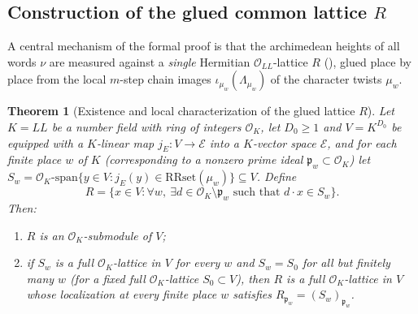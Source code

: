 \documentclass[11pt]{amsart}
\newcommand{\Oc}{\mathcal{O}}
\newcommand{\fp}{\mathfrak{p}}
\theoremstyle{plain}
\newtheorem{theorem}{Theorem}[section]
\theoremstyle{definition}
\numberwithin{equation}{section}
\begin{document}
\subsection{Construction of the glued common lattice $R$}

A central mechanism of the formal proof is that the archimedean heights of all words $\nu$ are
measured against a \emph{single} Hermitian $\Oc_{LL}$-lattice $R$ (), glued place by place
from the local $m$-step chain images $\iota_{\mu_w}(\Lambda_{\mu_w})$ of the character twists
$\mu_w$.

\begin{theorem}[Existence and local characterization of the glued lattice $R$]\label{thm:gluedR}
Let $K=LL$ be a number field with ring of integers $\Oc_K$, let $D_0\ge1$ and $V=K^{D_0}$ be
equipped with a $K$-linear map $j_E:V\to \mathcal E$ into a $K$-vector space $\mathcal E$, and for
each finite place $w$ of $K$ (corresponding to a nonzero prime ideal $\fp_w\subset\Oc_K$) let
$S_w=\Oc_K\text{-}\mathrm{span}\{y\in V : j_E(y)\in \mathrm{RRset}(\mu_w)\}\subseteq V$. Define
\begin{equation}\label{eq:prescribedR}
R=\bigl\{x\in V : \forall w,\ \exists d\in\Oc_K\setminus\fp_w\text{ such that } d\cdot x\in S_w\bigr\}.
\end{equation}
Then:
\begin{enumerate}[label=(\roman*)]
\item $R$ is an $\Oc_K$-submodule of $V$;
\item if $S_w$ is a full $\Oc_K$-lattice in $V$ for every $w$ and $S_w=S_0$ for all but finitely
  many $w$ (for a fixed full $\Oc_K$-lattice $S_0\subset V$), then $R$ is a full $\Oc_K$-lattice in
  $V$ whose localization at every finite place $w$ satisfies $R_{\fp_w}=(S_w)_{\fp_w}$.
\end{enumerate}
\end{theorem}
\end{document}

